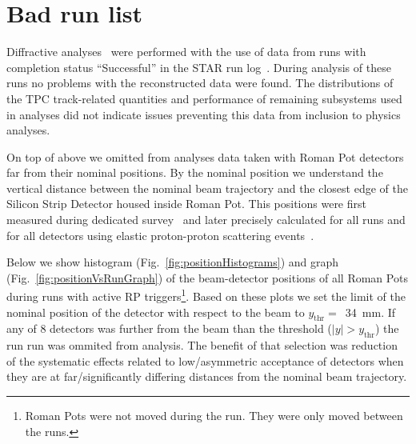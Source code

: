 

\chapter{Bad run list}\label{chap:badRunList}

Diffractive analyses~\cite{AnalysisNoteRafal,AnalysisNoteLukasz} were performed with the use of data from runs with completion status ``Successful'' in the STAR run log~\cite{RunLog}. During analysis of these runs no problems with the reconstructed data were found. The distributions of the TPC track-related quantities and performance of remaining subsystems used in analyses did not indicate issues preventing this data from inclusion to physics analyses.

On top of above we omitted from analyses data taken with Roman Pot detectors far from their nominal positions. By the nominal position we understand the vertical distance between the nominal beam trajectory and the closest edge of the Silicon Strip Detector housed inside Roman Pot. This positions were first measured during dedicated survey~\cite{surveyNote} and later precisely calculated for all runs and for all detectors using elastic proton-proton scattering events~\cite{alignmentPresentation,alignmentDirectory}.%

Below we show histogram (Fig.~\ref{fig:positionHistograms}) and graph (Fig.~\ref{fig:positionVsRunGraph}) of the beam-detector positions of all Roman Pots during runs with active RP triggers\footnote{Roman Pots were not moved during the run. They were only moved between the runs.}. Based on these plots we set the limit of the nominal position of the detector with respect to the beam to $y_{\text{thr}} =$~34~mm. If any of 8 detectors was further from the beam than the threshold ($|y|>y_{\text{thr}}$) the run run was ommited from analysis. The benefit of that selection was reduction of the systematic effects related to low/asymmetric acceptance of detectors when they are at far/significantly differing distances from the nominal beam trajectory.

